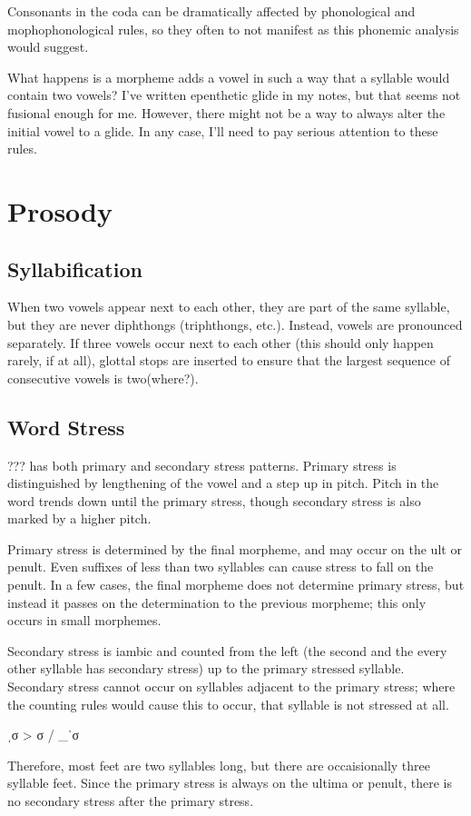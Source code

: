 \documentclass[12pt]{book} %
\begin{document}
{\color{cyan}
Consonants in the coda can be dramatically affected by phonological and mophophonological rules, so they often to not manifest as this phonemic analysis would suggest.
}

{\color{red}
What happens is a morpheme adds a vowel in such a way that a syllable would contain two vowels?
I've written epenthetic glide in my notes, but that seems not fusional enough for me.
However, there might not be a way to always alter the initial vowel to a glide.
In any case, I'll need to pay serious attention to these rules.
}


\section{Prosody}

\subsection{Syllabification}

{\color{cyan}
When two vowels appear next to each other, they are part of the same syllable, but they are never diphthongs (triphthongs, etc.). Instead, vowels are pronounced separately.
If three vowels occur next to each other {\color{red}(this should only happen rarely, if at all)}, glottal stops are inserted to ensure that the largest sequence of consecutive vowels is two{\color{red}(where?)}.
}

\subsection{Word Stress}

??? has both primary and secondary stress patterns.
Primary stress is distinguished by lengthening of the vowel and a step up in pitch.
Pitch in the word trends down until the primary stress, though secondary stress is also marked by a higher pitch.

Primary stress is determined by the final morpheme, and may occur on the ult or penult.
Even suffixes of less than two syllables can cause stress to fall on the penult.
In a few cases, the final morpheme does not determine primary stress, but instead it passes on the determination to the previous morpheme; this only occurs in small morphemes.

Secondary stress is iambic and counted from the left (the second and the every other syllable has secondary stress) up to the primary stressed syllable.
Secondary stress cannot occur on syllables adjacent to the primary stress; where the counting rules would cause this to occur, that syllable is not stressed at all.
\begin{center}
ˌσ > σ / \_ˈσ
\end{center}
Therefore, most feet are two syllables long, but there are occaisionally three syllable feet.
Since the primary stress is always on the ultima or penult, there is no secondary stress after the primary stress.
\end{document}
